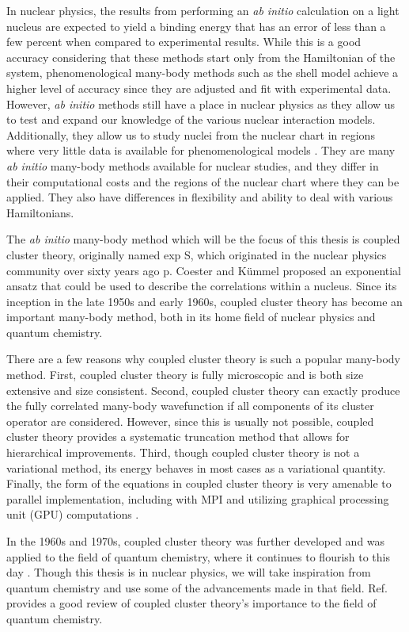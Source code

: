 In nuclear physics, the results from performing an \textit{ab initio} calculation on a light nucleus are expected to yield a binding energy that has an error of less than a few percent when compared to experimental results. While this is a good accuracy considering that these methods start only from the Hamiltonian of the system, phenomenological many-body methods such as the shell model achieve a higher level of accuracy since they are adjusted and fit with experimental data. However, \textit{ab initio} methods still have a place in nuclear physics as they allow us to test and expand our knowledge of the various nuclear interaction models. Additionally, they allow us to study nuclei from the nuclear chart in regions where very little data is available for phenomenological models \cite{Ref16}. They are many \textit{ab initio} many-body methods available for nuclear studies, and they differ in their computational costs and the regions of the nuclear chart where they can be applied. They also have differences in flexibility and ability to deal with various Hamiltonians.

The \textit{ab initio} many-body method which will be the focus of this thesis is coupled cluster theory, originally named exp S, which originated in the nuclear physics community over sixty years ago p. Coester and K\"{u}mmel proposed an exponential ansatz that could be used to describe the correlations within a nucleus. Since its inception in the late 1950s and early 1960s, coupled cluster theory has become an important many-body method, both in its home field of nuclear physics and quantum chemistry. 

There are a few reasons why coupled cluster theory is such a popular many-body method. First, coupled cluster theory is fully microscopic and is both size extensive and size consistent. Second, coupled cluster theory can exactly produce the fully correlated many-body wavefunction if all components of its cluster operator are considered. However, since this is usually not possible, coupled cluster theory provides a systematic truncation method that allows for hierarchical improvements. Third, though coupled cluster theory is not a variational method, its energy behaves in most cases as a variational quantity. Finally, the form of the equations in coupled cluster theory is very amenable to parallel implementation, including with MPI and utilizing graphical processing unit (GPU) computations \cite{Ref148}.

 In the 1960s and 1970s, coupled cluster theory was further developed and was applied to the field of quantum chemistry, where it continues to flourish to this day \cite{Ref151, Ref150, Ref149}. Though this thesis is in nuclear physics, we will take inspiration from quantum chemistry and use some of the advancements made in that field. Ref. \cite{Ref149} provides a good review of coupled cluster theory's importance to the field of quantum chemistry.

